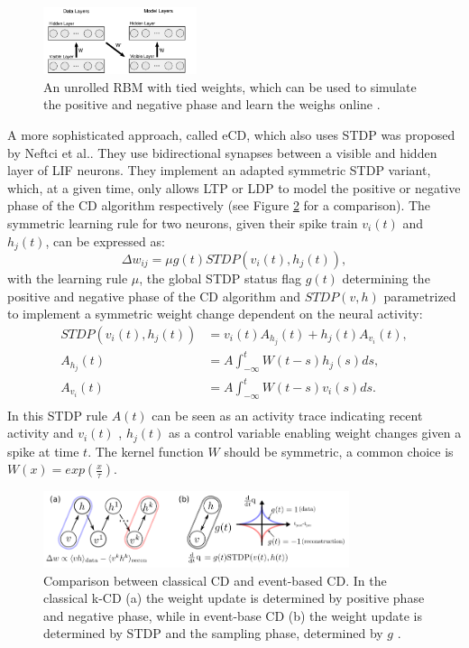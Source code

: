 \begin{figure}
	\centering
    	\includegraphics[width=0.4\textwidth]{imgs/evtCD.png} 
    \caption[An unrolled RBM with tied weights for CD.]{An unrolled RBM with tied weights, which can be used to simulate the positive and negative phase and learn the weighs online \cite{Neil2013}.}
	\label{fig:evtCD}
\end{figure}

A more sophisticated approach, called eCD, which also uses STDP was proposed by Neftci et al.\cite{Neftci2013}.
They use bidirectional synapses between a visible and hidden layer of LIF neurons.
They implement an adapted symmetric STDP variant, which, at a given time, only allows LTP or LDP to model the positive or negative phase of the CD algorithm respectively (see Figure \ref{fig:ecdcomp} for a comparison). 
The symmetric learning rule for two neurons, given their spike train $v_i(t)$ and $h_j(t)$, can be expressed as:
\[
\Delta w_{ij} = \mu g(t) STDP(v_i(t), h_j(t)),
\]
with the learning rule $\mu$, the global STDP status flag $g(t)$ determining the positive and negative phase of the CD algorithm and $STDP(v, h)$ parametrized to implement a symmetric weight change dependent on the neural activity:
\[
\begin{split}
STDP(v_i(t), h_j(t)) &= v_i(t) A_{h_j}(t) + h_j(t) A_{v_i}(t), \\
A_{h_j}(t) &= A \int_{- \infty}^t W(t-s) h_j(s) ds, \\ 
A_{v_i}(t) &= A \int_{- \infty}^t W(t-s) v_i(s) ds. \\ 
\end{split}
\]
In this STDP rule $A(t)$ can be seen as an activity trace indicating recent activity and $v_i(t)$ , $h_j(t)$ as a control variable enabling weight changes given a spike at time $t$.    
The kernel function $W$ should be symmetric, a common choice is $W(x) = exp(\frac{x}{\tau})$. 

\begin{figure}
	\centering
    	\includegraphics[width=0.8\textwidth]{imgs/eCD2.png} 
    \caption[Comparison between classical CD and event-based CD.]{Comparison between classical CD and event-based CD. In the classical k-CD (a) the weight update is determined by positive phase and negative phase, while in event-base CD (b) the weight update is determined by STDP and the sampling phase, determined by $g$ \cite{Neftci2013}.}
	\label{fig:ecdcomp}
\end{figure}
  

